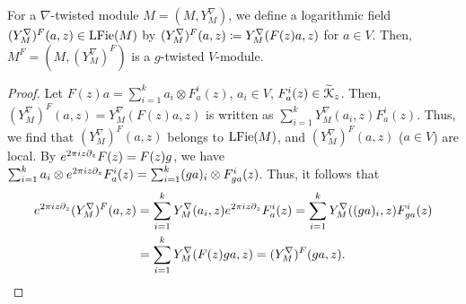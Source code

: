 \documentclass[final,reqno]{amsart}
\begin{document}
    \begin{thm}\label{thm:conn tw mod to log tw mod}
        For a $\nabla$-twisted module $M=(M,Y^\nabla_M)$, we define a logarithmic field $(Y^\nabla_M)^F(a,z)\in\operatorname{LFie}(M)$ by $(Y^\nabla_M)^F(a,z)\coloneqq Y^\nabla_M(F(z)a,z)$ for $a\in V$. Then, $M^F=(M,(Y^\nabla_M)^F)$ is a $g$-twisted $V$-module.
    \end{thm}

    \begin{proof}
    Let $F(z)a=\sum_{i=1}^ka_i\otimes F_a^i(z)$, $a_i\in V$, $F^i_a(z)\in\widetilde{\EuScript{K}}_z$. Then, $(Y^\nabla_M)^F(a,z)=Y^\nabla_M(F(z)a,z)$ is written as $\sum_{i=1}^kY^\nabla_M(a_i,z)F_a^i(z)$. Thus, we find that $(Y^\nabla_M)^F(a,z)$ belongs to $\operatorname{LFie}(M)$, and $(Y^\nabla_M)^F(a,z)$ ($a\in V$) are local. By  $e^{2\pi iz\partial_z}F(z)=F(z)g$, we have $\sum_{i=1}^ka_i\otimes e^{2\pi iz\partial_z}F^i_a(z)=\sum_{i=1}^k(ga)_i\otimes F^i_{ga}(z)$. Thus, it follows that
    \begin{align*}
        e^{2\pi iz\partial_z}(Y^\nabla_M)^F(a,z)
        &=\sum_{i=1}^kY^\nabla_M(a_i,z)e^{2\pi iz\partial_z}F^i_a(z)
        =\sum_{i=1}^kY^\nabla_M((ga)_i,z)F^i_{ga}(z)\\
        &=\sum_{i=1}^kY^\nabla_M(F(z)ga,z)
        =(Y^\nabla_M)^F(ga,z).
    \end{align*}


\end{proof}
\end{document}
